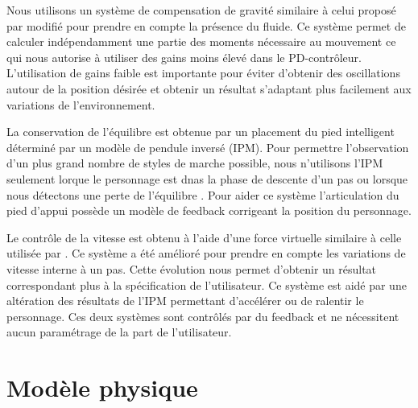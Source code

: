 \documentclass{llncs}
\begin{document}
Nous utilisons un système de compensation de gravité similaire à celui proposé par \cite{coros2010generalized} modifié pour prendre en compte la présence du fluide. Ce système permet de calculer indépendamment une partie des moments nécessaire au mouvement ce qui nous autorise à utiliser des gains moins élevé dans le PD-contrôleur. L'utilisation de gains faible est importante pour éviter d'obtenir des oscillations autour de la position désirée et obtenir un résultat s'adaptant plus facilement aux variations de l'environnement.

La conservation de l'équilibre est obtenue par un placement du pied intelligent déterminé par un modèle de pendule inversé (IPM). Pour permettre l'observation d'un plus grand nombre de styles de marche possible, nous n'utilisons l'IPM seulement lorque le personnage est dnas la phase de descente d'un pas ou lorsque nous détectons une perte de l'équilibre . Pour aider ce système l'articulation du pied d'appui possède un modèle de feedback corrigeant la position du personnage.

Le contrôle de la vitesse est obtenu à l'aide d'une force virtuelle similaire à celle utilisée par \cite{coros2010generalized}. Ce système a été amélioré pour prendre en compte les variations de vitesse interne à un pas. Cette évolution nous permet d'obtenir un résultat correspondant plus à la spécification de l'utilisateur. Ce système est aidé par une altération des résultats de l'IPM permettant d'accélérer ou de ralentir le personnage. Ces deux systèmes sont contrôlés par du feedback et ne nécessitent aucun paramétrage de la part de l'utilisateur.

%
\section{Modèle physique}
\end{document}
